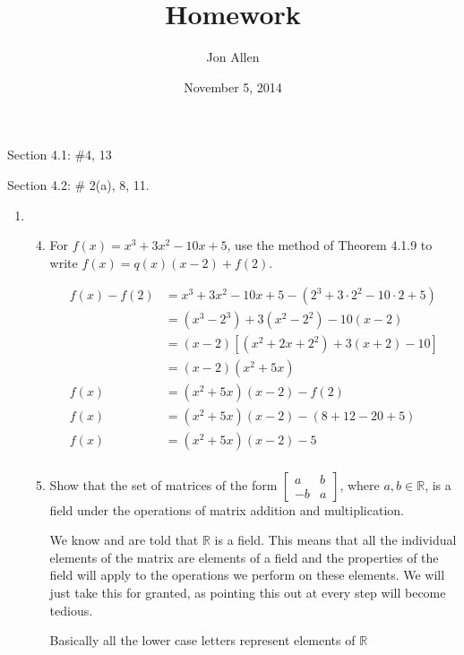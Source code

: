 \documentclass[letterpaper]{article}
\begin{document}
\title{Homework}
\date{November 5, 2014}
\author{Jon Allen}
\maketitle
Section 4.1: \#4, 13

Section 4.2: \# 2(a), 8, 11.
\renewcommand{\labelenumi}{4.\arabic{enumi}}
\renewcommand{\labelenumii}{\arabic{enumii}.}
\renewcommand{\labelenumiii}{(\alph{enumiii})}
\begin{enumerate}
\item
  \begin{enumerate}
  \setcounter{enumii}{3}
  \item
    For $f(x)=x^3+3x^2-10x+5$, use the method of Theorem 4.1.9 to write $f(x)=q(x)(x-2)+f(2)$.

    \begin{align*}
      f(x)-f(2)&=x^3+3x^2-10x+5-(2^3+3\cdot 2^2-10\cdot 2+5)\\
      &=(x^3-2^3)+3(x^2-2^2)-10(x-2)\\
      &=(x-2)[(x^2+2x+2^2)+3(x+2)-10]\\
      &=(x-2)(x^2+5x)\\
      f(x)&=(x^2+5x)(x-2)-f(2)\\
      f(x)&=(x^2+5x)(x-2)-(8+12-20+5)\\
      f(x)&=(x^2+5x)(x-2)-5\\
    \end{align*}
  \setcounter{enumii}{12}
  \item
    Show that the set of matrices of the form $\left[\begin{array}{rr}a&b\\-b&a\end{array}\right]$, where $a,b\in \mathbb{R}$, is a field under the operations of matrix addition and multiplication.

    We know and are told that $\mathbb{R}$ is a field. This means that all the individual elements of the matrix are elements of a field and the properties of the field will apply to the operations we perform on these elements. We will just take this for granted, as pointing this out at every step will become tedious.

    Basically all the lower case letters represent elements of $\mathbb{R}$


\end{enumerate}
\end{enumerate}
\end{document}
